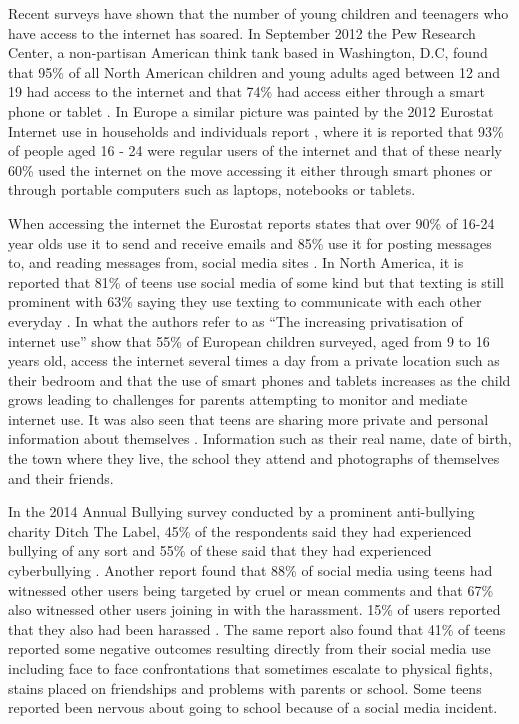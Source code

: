 Recent surveys have shown that the number of young children and teenagers who have access to the internet has soared. In September 2012 the Pew Research Center, a non-partisan American think tank based in Washington, D.C, found that 95\% of all North American children and young adults aged between 12 and 19 had access to the internet and that 74\% had access either through a smart phone or tablet \cite{teens-fact-sheet}. In Europe a similar picture was painted by the 2012 Eurostat Internet use in households and individuals report \cite{seybert_internet_2012}, where it is reported that 93\% of people aged 16 - 24 were regular users of the internet and that of these nearly 60\% used the internet on the move accessing it either through smart phones or through portable computers such as laptops, notebooks or tablets. 

When accessing the internet the Eurostat reports states that over 90\% of 16-24 year olds use it to send and receive emails and 85\% use it for posting messages to, and reading messages from, social media sites \cite{seybert_internet_2012}. In North America, it is reported that 81\% of teens use social media of some kind but that texting is still prominent with 63\% saying they use texting to communicate with each other everyday \cite{teens-fact-sheet}. In what the authors refer to as ``The increasing privatisation of internet use'' \citet{mascheroni_net_2014} show that 55\% of European children surveyed, aged from 9 to 16 years old, access the internet several times a day from a private location such as their bedroom and that the use of smart phones and tablets increases as the child grows leading to challenges for parents attempting to monitor and mediate internet use. It was also seen that teens are sharing more private and personal information about themselves \cite{teens-fact-sheet}. Information such as their real name, date of birth, the town where they live, the school they attend and photographs of themselves and their friends.

In the 2014 Annual Bullying survey conducted by a prominent anti-bullying charity Ditch The Label, 45\% of the  respondents said they had experienced bullying of any sort and 55\% of these said that they had experienced cyberbullying \cite{ditch:2014}. Another report found that 88\% of social media using teens had witnessed other users being targeted by cruel or mean comments and that 67\% also witnessed other users joining in with the harassment. 15\% of users reported that they also had been harassed \cite{lenhart_teens_2011}. The same report also found that 41\% of teens reported some negative outcomes resulting directly from their social media use including face to face confrontations that sometimes escalate to physical fights, stains placed on friendships and problems with parents or school. Some teens reported been nervous about going to school because of a social media incident. 


